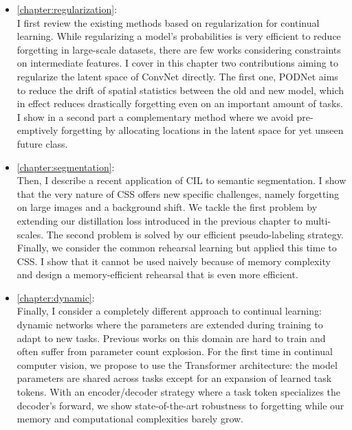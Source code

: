 \begin{itemize}
      \item \autoref{chapter:regularization}: \\
            I first review the existing methods based on regularization for continual learning. While
            regularizing a model's probabilities is very efficient to reduce forgetting in large-scale
            datasets, there are few works considering constraints on intermediate features. I cover in this
            chapter two contributions aiming to regularize the latent space of \acs{ConvNet} directly. The
            first one, \acf{PODNet} aims to reduce the drift of spatial statistics between the old and new
            model, which in effect reduces drastically forgetting even on an important amount of tasks. I show in a
            second part a complementary method where we avoid pre-emptively forgetting by allocating
            locations in the latent space for yet unseen future class.
      \item \autoref{chapter:segmentation}: \\
            Then, I describe a recent application of \acf{CIL} to semantic segmentation. I show that
            the very nature of \acf{CSS} offers new specific challenges, namely forgetting on large
            images and a background shift. We tackle the first problem by extending our distillation
            loss introduced in the previous chapter to multi-scales. The second problem is solved by
            our efficient pseudo-labeling strategy. Finally, we consider the common rehearsal learning
            but applied this time to \ac{CSS}. I show that it cannot be used naively because of memory
            complexity and design a memory-efficient rehearsal that is even more efficient.
      \item \autoref{chapter:dynamic}: \\
            Finally, I consider a completely different approach to continual learning: dynamic networks
            where the parameters are extended during training to adapt to new tasks. Previous works on
            this domain are hard to train and often suffer from parameter count explosion. For the
            first time in continual computer vision, we propose to use the Transformer architecture:
            the model parameters are shared across tasks except for an
            expansion of learned task tokens. With an encoder/decoder strategy where a task token
            specializes the decoder's forward, we show state-of-the-art robustness to forgetting
            while our memory and computational complexities barely grow.
\end{itemize}

